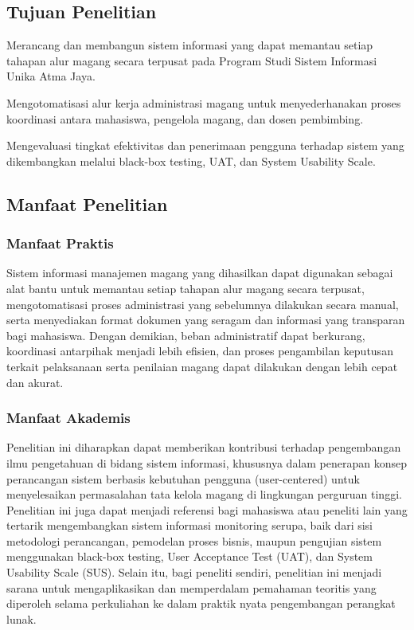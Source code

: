 \subsection{Tujuan Penelitian}
\begin{daftartujuan}
    \item Merancang dan membangun sistem informasi yang dapat memantau setiap tahapan 
          alur magang secara terpusat pada Program Studi Sistem Informasi Unika Atma Jaya.
    \item Mengotomatisasi alur kerja administrasi magang untuk menyederhanakan proses 
          koordinasi antara mahasiswa, pengelola magang, dan dosen pembimbing.
    \item Mengevaluasi tingkat efektivitas dan penerimaan pengguna terhadap sistem yang 
          dikembangkan melalui black-box testing, UAT, dan System Usability Scale.
\end{daftartujuan}

\subsection{Manfaat Penelitian}

\subsubsection{Manfaat Praktis}
Sistem informasi manajemen magang yang dihasilkan dapat digunakan sebagai alat bantu 
untuk memantau setiap tahapan alur magang secara terpusat, mengotomatisasi proses 
administrasi yang sebelumnya dilakukan secara manual, serta menyediakan format dokumen 
yang seragam dan informasi yang transparan bagi mahasiswa. Dengan demikian, beban 
administratif dapat berkurang, koordinasi antarpihak menjadi lebih efisien, dan proses 
pengambilan keputusan terkait pelaksanaan serta penilaian magang dapat dilakukan dengan 
lebih cepat dan akurat.

\subsubsection{Manfaat Akademis}
Penelitian ini diharapkan dapat memberikan kontribusi terhadap pengembangan ilmu 
pengetahuan di bidang sistem informasi, khususnya dalam penerapan konsep perancangan 
sistem berbasis kebutuhan pengguna (user-centered) untuk menyelesaikan permasalahan 
tata kelola magang di lingkungan perguruan tinggi. Penelitian ini juga dapat menjadi 
referensi bagi mahasiswa atau peneliti lain yang tertarik mengembangkan sistem informasi 
monitoring serupa, baik dari sisi metodologi perancangan, pemodelan proses bisnis, 
maupun pengujian sistem menggunakan black-box testing, User Acceptance Test (UAT), 
dan System Usability Scale (SUS). Selain itu, bagi peneliti sendiri, penelitian ini 
menjadi sarana untuk mengaplikasikan dan memperdalam pemahaman teoritis yang diperoleh 
selama perkuliahan ke dalam praktik nyata pengembangan perangkat lunak.

